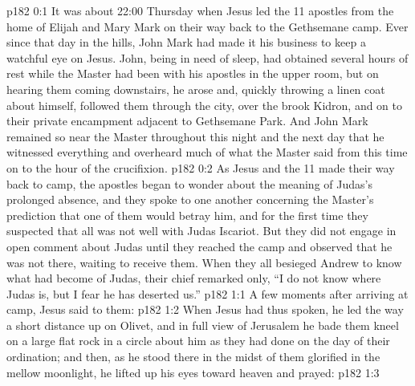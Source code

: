 \author{Midwayer Commission}
\vs p182 0:1 It was about 22:00 Thursday when Jesus led the 11 apostles from the home of Elijah and Mary Mark on their way back to the Gethsemane camp. Ever since that day in the hills, John Mark had made it his business to keep a watchful eye on Jesus. John, being in need of sleep, had obtained several hours of rest while the Master had been with his apostles in the upper room, but on hearing them coming downstairs, he arose and, quickly throwing a linen coat about himself, followed them through the city, over the brook Kidron, and on to their private encampment adjacent to Gethsemane Park. And John Mark remained so near the Master throughout this night and the next day that he witnessed everything and overheard much of what the Master said from this time on to the hour of the crucifixion.
\vs p182 0:2 As Jesus and the 11 made their way back to camp, the apostles began to wonder about the meaning of Judas’s prolonged absence, and they spoke to one another concerning the Master’s prediction that one of them would betray him, and for the first time they suspected that all was not well with Judas Iscariot. But they did not engage in open comment about Judas until they reached the camp and observed that he was not there, waiting to receive them. When they all besieged Andrew to know what had become of Judas, their chief remarked only, “I do not know where Judas is, but I fear he has deserted us.”
\vs p182 1:1 A few moments after arriving at camp, Jesus said to them: 
\vs p182 1:2 When Jesus had thus spoken, he led the way a short distance up on Olivet, and in full view of Jerusalem he bade them kneel on a large flat rock in a circle about him as they had done on the day of their ordination; and then, as he stood there in the midst of them glorified in the mellow moonlight, he lifted up his eyes toward heaven and prayed:
\vs p182 1:3 
